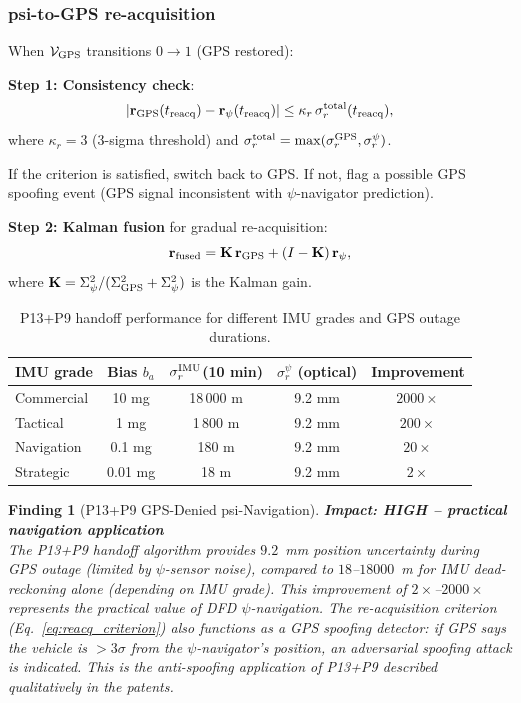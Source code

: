 \documentclass[aps,prd,twocolumn,superscriptaddress,nofootinbib]{revtex4-2}
\newtheorem{finding}{Finding}
\begin{document}
\subsubsection{psi-to-GPS re-acquisition}

When $\mathcal{V}_{\rm GPS}$ transitions $0 \to 1$ (GPS restored):

\textbf{Step 1: Consistency check}:
\begin{equation}
\left|\mathbf{r}_{\rm GPS}(t_{\rm reacq}) - \mathbf{r}_\psi(t_{\rm reacq})\right|
\leq \kappa_r\,\sigma_r^{\rm total}(t_{\rm reacq}),
\label{eq:reacq_criterion}
\end{equation}
where $\kappa_r = 3$ (3-sigma threshold) and
$\sigma_r^{\rm total} = \max(\sigma_r^{\rm GPS}, \sigma_r^{\psi})$.

If the criterion is satisfied, switch back to GPS. If not, flag a
possible GPS spoofing event (GPS signal inconsistent with $\psi$-navigator
prediction).

\textbf{Step 2: Kalman fusion} for gradual re-acquisition:
\begin{equation}
\mathbf{r}_{\rm fused} = \mathbf{K}\,\mathbf{r}_{\rm GPS}
+ (I - \mathbf{K})\,\mathbf{r}_\psi,
\label{eq:kalman_fused}
\end{equation}
where $\mathbf{K} = \Sigma_\psi^2 / (\Sigma_{\rm GPS}^2 + \Sigma_\psi^2)$
is the Kalman gain.

\begin{table}[h]
\caption{P13+P9 handoff performance for different IMU grades and GPS outage durations.}
\label{tab:handoff}
\begin{ruledtabular}
\begin{tabular}{lcccc}
IMU grade & Bias $b_a$ & $\sigma_r^{\rm IMU}$(10 min) &
  $\sigma_r^{\psi}$ (optical) & Improvement \\
\hline
Commercial & 10 mg & 18\,000 m & 9.2 mm & $2000\times$ \\
Tactical & 1 mg & 1\,800 m & 9.2 mm & $200\times$ \\
Navigation & 0.1 mg & 180 m & 9.2 mm & $20\times$ \\
Strategic & 0.01 mg & 18 m & 9.2 mm & $2\times$ \\
\end{tabular}
\end{ruledtabular}
\end{table}

\begin{finding}[P13+P9 GPS-Denied psi-Navigation]
\label{find:psi_nav}
\textbf{Impact: HIGH -- practical navigation application}\\
The P13+P9 handoff algorithm provides $9.2$~mm position uncertainty
during GPS outage (limited by $\psi$-sensor noise), compared to
$18$--$18000$~m for IMU dead-reckoning alone (depending on IMU grade).
This improvement of $2\times$--$2000\times$ represents the practical
value of DFD $\psi$-navigation. The re-acquisition criterion
(Eq.~\ref{eq:reacq_criterion}) also functions as a GPS spoofing
detector: if GPS says the vehicle is $> 3\sigma$ from the
$\psi$-navigator's position, an adversarial spoofing attack is
indicated. This is the anti-spoofing application of P13+P9 described
qualitatively in the patents.
\end{finding}
\end{document}
